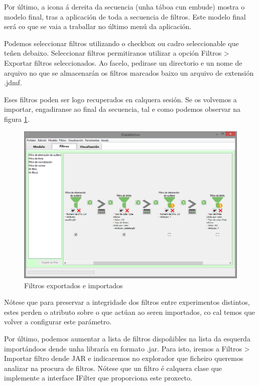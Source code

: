 Por último, a icona á dereita da secuencia (unha táboa cun embude) mostra o modelo final, tras a aplicación de toda a secuencia de filtros. Este modelo final será co que se vaia a traballar no último menú da aplicación.

Podemos seleccionar filtros utilizando o checkbox ou cadro seleccionable que teñen debaixo. Seleccionar filtros permitiranos utilizar a opción Filtros \textgreater{} Exportar filtros seleccionados. Ao facelo, pedirase un directorio e un nome de arquivo no que se almacenarán os filtros marcados baixo un arquivo de extensión .jdmf.

Eses filtros poden ser logo recuperados en calquera sesión. Se os volvemos a importar, engadiranse ao final da secuencia, tal e como podemos observar na figura \ref{filtrosRecuperados}.

\begin{figure}
\centering
\includegraphics[width=\textwidth,height=\textheight,keepaspectratio]{figuras/filtrosRecuperados}
\caption{Filtros exportados e importados}
\label{filtrosRecuperados}
\end{figure}

Nótese que para preservar a integridade dos filtros entre experimentos distintos, estes perden o atributo sobre o que actúan ao seren importados, co cal temos que volver a configurar este parámetro.

Por último, podemos aumentar a lista de filtros dispoñibles na lista da esquerda importándoos dende unha libraría en formato .jar. Para isto, iremos a Filtros \textgreater{} Importar filtro dende JAR e indicaremos no explorador que ficheiro queremos analizar na procura de filtros. Nótese que un filtro é calquera clase que implemente a interface IFilter que proporciona este proxecto.

